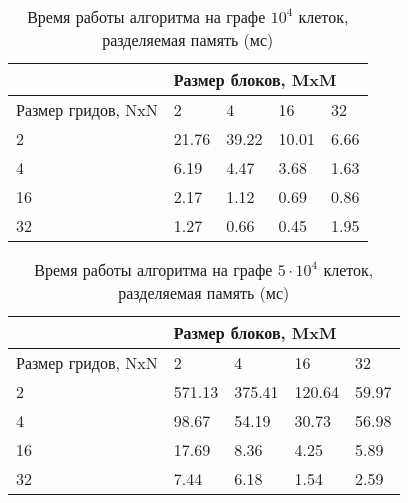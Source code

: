 \documentclass[a4paper, 12pt]{article}
\begin{document}
    \begin{table}[h!]
    \centering
\begin{tabular}{|l|llll|}
\hline
 & \multicolumn{4}{l|}{Размер блоков, MxM} \\ \hline
Размер гридов, NxN & \multicolumn{1}{l|}{2} & \multicolumn{1}{l|}{4} & \multicolumn{1}{l|}{16} & 32 \\ \hline
2 & \multicolumn{1}{l|}{21.76} & \multicolumn{1}{l|}{39.22} & \multicolumn{1}{l|}{10.01} & 6.66 \\ \hline
4 & \multicolumn{1}{l|}{6.19} & \multicolumn{1}{l|}{4.47} & \multicolumn{1}{l|}{3.68} & 1.63 \\ \hline
16 & \multicolumn{1}{l|}{2.17} & \multicolumn{1}{l|}{1.12} & \multicolumn{1}{l|}{0.69} & 0.86 \\ \hline
32 & \multicolumn{1}{l|}{1.27} & \multicolumn{1}{l|}{0.66} & \multicolumn{1}{l|}{0.45} & 1.95 \\ \hline
\end{tabular}
\caption{Время работы алгоритма на графе $10^4$ клеток, разделяемая память (мс)}
\label{tab4}
\end{table}

    \begin{table}[h!]
    \centering
\begin{tabular}{|l|llll|}
\hline
 & \multicolumn{4}{l|}{Размер блоков, MxM} \\ \hline
Размер гридов, NxN & \multicolumn{1}{l|}{2} & \multicolumn{1}{l|}{4} & \multicolumn{1}{l|}{16} & 32 \\ \hline
2 & \multicolumn{1}{l|}{571.13} & \multicolumn{1}{l|}{375.41} & \multicolumn{1}{l|}{120.64} & 59.97 \\ \hline
4 & \multicolumn{1}{l|}{98.67} & \multicolumn{1}{l|}{54.19} & \multicolumn{1}{l|}{30.73} & 56.98 \\ \hline
16 & \multicolumn{1}{l|}{17.69} & \multicolumn{1}{l|}{8.36} & \multicolumn{1}{l|}{4.25} & 5.89 \\ \hline
32 & \multicolumn{1}{l|}{7.44} & \multicolumn{1}{l|}{6.18} & \multicolumn{1}{l|}{1.54} & 2.59 \\ \hline
\end{tabular}
\caption{Время работы алгоритма на графе $5\cdot10^4$ клеток, разделяемая память (мс)}
\label{tab5}
\end{table}
\end{document}
